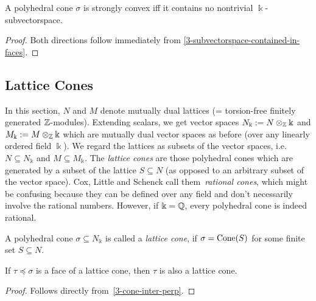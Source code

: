 \begin{lemma}
  \label{3-strongly-convex-iff-no-subspace}
  \uses{}
  A polyhedral cone \( \sigma \) is strongly convex iff it contains no
  nontrivial \( \Bbbk \)-subvectorspace.
\end{lemma}
\begin{proof}
  \uses{}
  Both directions follow immediately from
  \ref{3-subvectorspace-contained-in-faces}.
\end{proof}


\subsection{Lattice Cones}

In this section, \( N \) and \( M \) denote mutually dual lattices (=
torsion-free finitely generated \( {\mathbb Z} \)-modules). Extending scalars,
we get vector spaces \( N_{\Bbbk} := N \otimes_{{\mathbb Z}} \Bbbk \) and \(
M_{\Bbbk} := M \otimes_{{\mathbb Z}} \Bbbk \) which are mutually dual vector
spaces as before (over any linearly ordered field \( \Bbbk \)). We
regard the lattices as subsets of the vector spaces, i.e. \( N
\subseteq N_{\Bbbk} \) and \( M \subseteq M_{\Bbbk} \). The
\emph{lattice cones} are those polyhedral cones which are generated by
a subset of the lattice \( S \subseteq N \) (as opposed to an
arbitrary subset of the vector space). Cox, Little and Schenck
\cite{Cox_2011} call them~\emph{rational cones}, which might be
confusing because they can be defined over any field and don't
necessarily involve the rational numbers. However, if \( \Bbbk = {\mathbb Q}
\), every polyhedral cone is indeed rational.

\begin{definition}
  \label{3-lattice-cone}
  A polyhedral cone \( \sigma \subseteq N_{\Bbbk} \) is called a
  \emph{lattice cone}, if \( \sigma = \operatorname{Cone}(S) \) for some finite set
  \( S \subseteq N \).
\end{definition}

\begin{lemma}
  \label{3-face-lattice-cone}
  If \( \tau \preceq \sigma \) is a face of a lattice cone, then
  \( \tau \) is also a lattice cone.
\end{lemma}
\begin{proof}
  \uses{}
  Follows directly from~\ref{3-cone-inter-perp}.
\end{proof}


